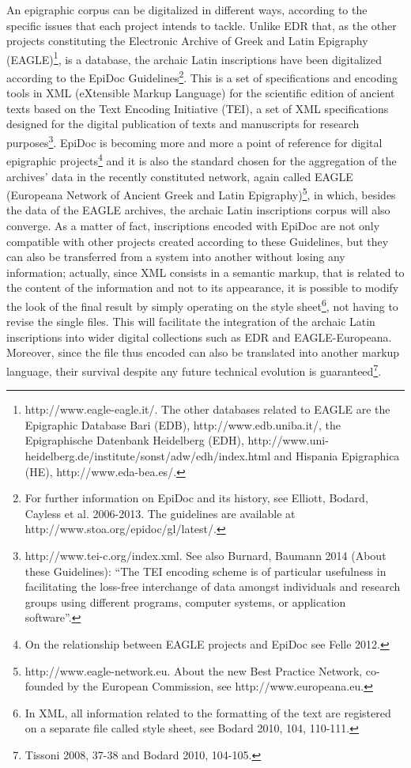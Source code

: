 \documentclass[amsthm,ebook]{saparticle}
\begin{document}
An epigraphic corpus can be digitalized in different ways, according to the specific issues that each project intends to
tackle. Unlike EDR that, as the other projects constituting the Electronic Archive of Greek and Latin Epigraphy
(EAGLE)\footnote{http://www.eagle-eagle.it/. The other databases related to EAGLE are the Epigraphic Database Bari
(EDB), http://www.edb.uniba.it/, the Epigraphische Datenbank Heidelberg (EDH),
http://www.uni-heidelberg.de/institute/sonst/adw/edh/index.html and Hispania Epigraphica (HE),
http://www.eda-bea.es/.}, is a database, the archaic Latin inscriptions have been digitalized according to the EpiDoc
Guidelines\footnote{For further information on EpiDoc and its history, see Elliott, Bodard, Cayless et al. 2006-2013.
The guidelines are available at http://www.stoa.org/epidoc/gl/latest/.}. This is a set of specifications and encoding
tools in XML (eXtensible Markup Language) for the scientific edition of ancient texts based on the Text Encoding
Initiative (TEI), a set of XML specifications designed for the digital publication of texts and manuscripts for
research purposes\footnote{http://www.tei-c.org/index.xml. See also Burnard, Baumann 2014 (About these Guidelines):
“The TEI encoding scheme is of particular usefulness in facilitating the loss-free interchange of data amongst
individuals and research groups using different programs, computer systems, or application software”.}. EpiDoc is
becoming more and more a point of reference for digital epigraphic projects\footnote{On the relationship between EAGLE
projects and EpiDoc see Felle 2012.} and it is also the standard chosen for the aggregation of the archives’ data in
the recently constituted network, again called EAGLE (Europeana Network of Ancient Greek and Latin
Epigraphy)\footnote{http://www.eagle-network.eu. About the new Best Practice Network, co-founded by the European
Commission, see http://www.europeana.eu.}, in which, besides the data of the EAGLE archives, the archaic Latin
inscriptions corpus will also converge. As a matter of fact, inscriptions encoded with EpiDoc are not only compatible
with other projects created according to these Guidelines, but they can also be transferred from a system into another
without losing any information; actually, since XML consists in a semantic markup, that is related to the content of
the information and not to its appearance, it is possible to modify the look of the final result by simply operating on
the style sheet\footnote{In XML, all information related to the formatting of the text are registered on a separate
file called style sheet, see Bodard 2010, 104, 110-111.}, not having to revise the single files. This will facilitate
the integration of the archaic Latin inscriptions into wider digital collections such as EDR and EAGLE-Europeana.
Moreover, since the file thus encoded can also be translated into another markup language, their survival despite any
future technical evolution is guaranteed\footnote{Tissoni 2008, 37-38 and Bodard 2010, 104-105.}.
\end{document}
